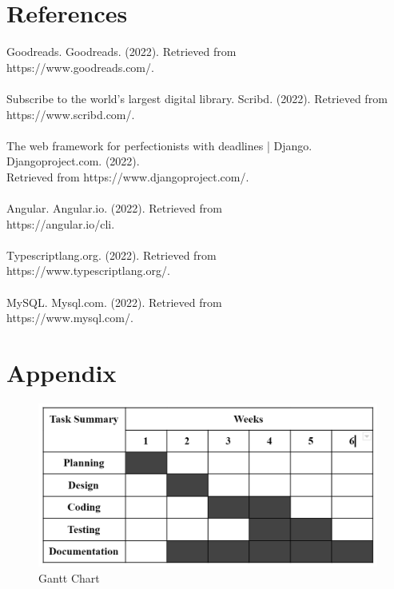 \documentclass[12pt]{article}
\begin{document}
\section{References}
\thispagestyle{empty}
Goodreads. Goodreads. (2022). Retrieved from\\
https://www.goodreads.com/.
\\\\
Subscribe to the world's largest digital library. Scribd. (2022). Retrieved from\\
https://www.scribd.com/.
\\\\
The web framework for perfectionists with deadlines | Django. Djangoproject.com. (2022).\\
Retrieved from https://www.djangoproject.com/.
\\\\
Angular. Angular.io. (2022). Retrieved from\\
https://angular.io/cli.
\\\\
Typescriptlang.org. (2022). Retrieved from\\
https://www.typescriptlang.org/.
\\\\
MySQL. Mysql.com. (2022). Retrieved from\\
https://www.mysql.com/.



\clearpage
\thispagestyle{empty}
\section{Appendix}
\thispagestyle{empty}
\begin{figure}[h]
    \centerline{\includegraphics[width = 190mm]{chart.png}}
    \caption{Gantt Chart}
    \label{fig}
\end{figure}
\begin{figure}[h]
\end{figure}
\end{document}
